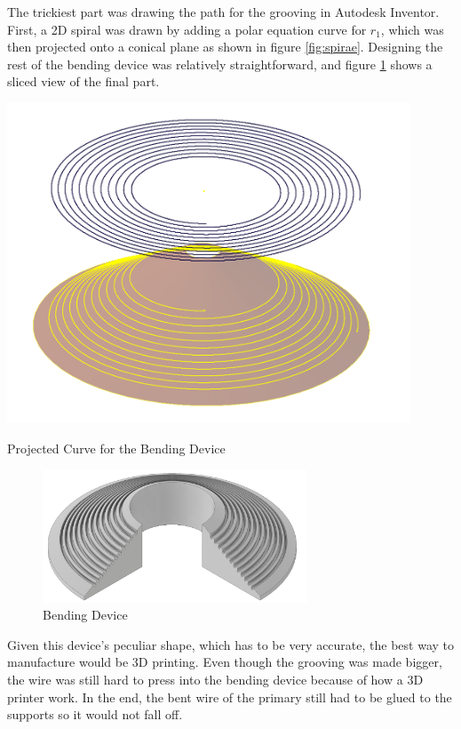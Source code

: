 The trickiest part was drawing the path for the grooving in Autodesk Inventor. First, a 2D spiral was drawn by adding a polar equation curve for \(r_1\), which was then projected onto a conical plane as shown in figure \ref{fig:spirae}. Designing the rest of the bending device was relatively straightforward, and figure \ref{fig:biegbieg} shows a sliced view of the final part.

\begin{marginfigure}[-3cm]
    \centering
    \includegraphics[width=0.9\textwidth]{kassandra/resources/JerJerWoBistDuSpirae.PNG}
    \caption{Projected Curve for the Bending Device}
    \label{fig:spirae}
\end{marginfigure}

\begin{figure}[h!]
    \centering
    \includegraphics[width=0.7\textwidth]{kassandra/resources/JerJerWoBistDuBiegeBieg.PNG}
    \caption{Bending Device}
    \label{fig:biegbieg}
\end{figure}

Given this device's peculiar shape, which has to be very accurate, the best way to manufacture would be 3D printing. Even though the grooving was made bigger, the wire was still hard to press into the bending device because of how a 3D printer work. In the end, the bent wire of the primary still had to be glued to the supports so it would not fall off. 

